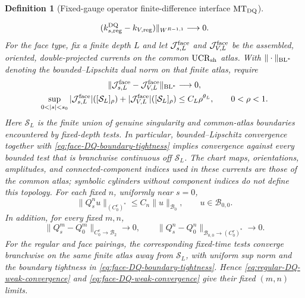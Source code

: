 \documentclass[11pt]{article}
\newtheorem{definition}[theorem]{Definition}
\newcommand{\cB}{\mathcal B}
\begin{document}
\begin{definition}[Fixed-gauge operator finite-difference interface
$\mathrm{MT}_{\rm DQ}$]
\begin{enumerate}[label=\textup{(MT\arabic*)}]
\begin{equation}
       (k_{s,\rm reg}^{\rm DQ}-k_{V,\rm reg})\|_{W^{R-1,1}}
       \longrightarrow0.
      \end{equation}
      For the face type, fix a finite depth $L$ and let
      $\mathcal J_{s,L}^{\rm face}$ and $\mathcal J_{V,L}^{\rm face}$ be the
      assembled, oriented, double-projected currents on the common
      $\mathrm{UCR}_{\rm sh}$ atlas.  With $\|\cdot\|_{\rm BL^*}$ denoting
      the bounded--Lipschitz dual norm on that finite atlas, require
      \begin{align}
       \|\mathcal J_{s,L}^{\rm face}
          -\mathcal J_{V,L}^{\rm face}\|_{\rm BL^*}&\longrightarrow0,
       \label{eq:face-DQ-weak-convergence}\\
       \sup_{0<|s|<s_0}|\mathcal J_{s,L}^{\rm face}|
          ([\mathcal S_L]_\rho)
       +|\mathcal J_{V,L}^{\rm face}|([\mathcal S_L]_\rho)
          &\le C_L\rho^{\theta_L},\qquad 0<\rho<1.
       \label{eq:face-DQ-boundary-tightness}
      \end{align}
      Here $\mathcal S_L$ is the finite union of genuine singularity and
      common-atlas boundaries encountered by fixed-depth tests.  In
      particular, bounded--Lipschitz convergence together with
      \eqref{eq:face-DQ-boundary-tightness} implies convergence against every
      bounded test that is branchwise continuous off $\mathcal S_L$.  The
      chart maps, orientations, amplitudes, and connected-component indices
      used in these currents are those of the common atlas; symbolic
      cylinders without component indices do not define this topology.  For
      each fixed $n$, uniformly near $s=0$,
      \begin{equation}
      \label{eq:DQ-side-fixed-time-continuity}
       \|Q_s^nu\|_{(C^r_0)^*}\le C_n\|u\|_{\cB_0},
       \qquad u\in\cB_{0,0}.
      \end{equation}
      In addition, for every fixed $m,n$,
      \begin{equation}
      \label{eq:fixed-time-evolution-convergence}
       \|Q_s^m-Q_0^m\|_{C^r_0\to\cB_2}\longrightarrow0,
       \qquad
       \|Q_s^n-Q_0^n\|_{\cB_{0,0}\to(C^r_0)^*}\longrightarrow0.
      \end{equation}
      For the regular and face pairings, the corresponding fixed-time tests
      converge branchwise on the same finite atlas away from
      $\mathcal S_L$, with uniform sup norm and the boundary tightness in
      \eqref{eq:face-DQ-boundary-tightness}.  Hence
      \eqref{eq:regular-DQ-weak-convergence} and
      \eqref{eq:face-DQ-weak-convergence} give their fixed $(m,n)$ limits.

\end{enumerate}
\end{definition}
\end{document}
